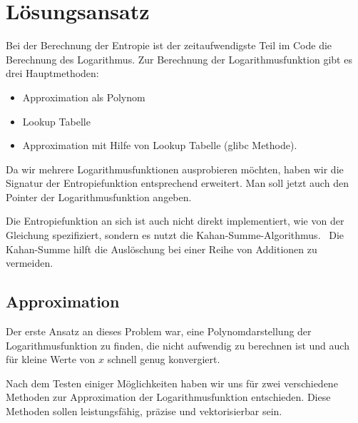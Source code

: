 \section{Lösungsansatz}
Bei der Berechnung der Entropie ist der zeitaufwendigste Teil im Code die Berechnung des Logarithmus.
Zur Berechnung der Logarithmusfunktion gibt es drei Hauptmethoden:
\begin{itemize}
    \item Approximation als Polynom
    \item Lookup Tabelle
    \item Approximation mit Hilfe von Lookup Tabelle (glibc Methode).
\end{itemize} 

Da wir mehrere Logarithmusfunktionen ausprobieren möchten, haben wir die Signatur der Entropiefunktion entsprechend erweitert. Man soll jetzt auch den Pointer der Logarithmusfunktion angeben.

Die Entropiefunktion an sich ist auch nicht direkt implementiert, wie von der Gleichung spezifiziert, sondern es nutzt die Kahan-Summe-Algorithmus.~\cite{kahan} Die Kahan-Summe hilft die Auslöschung bei einer Reihe von Additionen zu vermeiden.

\subsection{Approximation}
Der erste Ansatz an dieses Problem war, eine Polynomdarstellung der Logarithmusfunktion zu finden, die nicht aufwendig zu berechnen ist und auch für kleine Werte von $x$ schnell genug konvergiert.

Nach dem Testen einiger Möglichkeiten haben wir uns für zwei verschiedene Methoden zur Approximation der Logarithmusfunktion entschieden. Diese Methoden sollen leistungsfähig, präzise und vektorisierbar sein.

